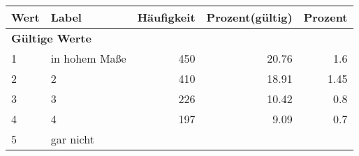      \begin{longtable}{lXrrr}
     \toprule
     \textbf{Wert} & \textbf{Label} & \textbf{Häufigkeit} & \textbf{Prozent(gültig)} & \textbf{Prozent} \\
     \endhead
     \midrule
     \multicolumn{5}{l}{\textbf{Gültige Werte}}\\

     1 &
     \multicolumn{1}{X}{ in hohem Maße   } &


       \num{450} &
       \num[round-mode=places,round-precision=2]{20.76} &
         \num[round-mode=places,round-precision=2]{1.6} \\

     2 &
     \multicolumn{1}{X}{ 2   } &


       \num{410} &
       \num[round-mode=places,round-precision=2]{18.91} &
         \num[round-mode=places,round-precision=2]{1.45} \\

     3 &
     \multicolumn{1}{X}{ 3   } &


       \num{226} &
       \num[round-mode=places,round-precision=2]{10.42} &
         \num[round-mode=places,round-precision=2]{0.8} \\

     4 &
     \multicolumn{1}{X}{ 4   } &


       \num{197} &
       \num[round-mode=places,round-precision=2]{9.09} &
         \num[round-mode=places,round-precision=2]{0.7} \\

     5 &
     \multicolumn{1}{X}{ gar nicht   } &



\end{longtable}
